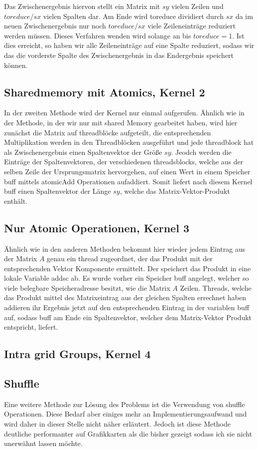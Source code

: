 \documentclass[10pt,a4paper]{article}
\begin{document}
	 Das Zwischenergebnis hiervon stellt ein Matrix mit $sy$ vielen Zeilen und $toreduce/sx$ vielen Spalten dar.
	 Am Ende wird toreduce dividiert durch $sx$ da im neuen Zwischenergebnis nur noch $toreduce/sx$ viele Zeileneinträge reduziert werden müssen. Dieses Verfahren wenden wird solange an bis $toreduce=1$. Ist dies erreicht, so haben wir alle Zeileneinträge auf eine Spalte reduziert, sodass wir das die vorderste Spalte des Zwischenergebnis in das Endergebnis speichert können.
	 \subsection{Sharedmemory mit Atomics, Kernel 2}
	 In der zweiten Methode wird der Kernel nur einmal aufgerufen. Ähnlich wie in der Methode, in der wir nur mit shared Memory gearbeitet haben, wird hier zunächst die Matrix auf threadblöcke aufgeteilt, die entsprechenden Multiplikation werden in den Threadblöcken ausgeführt und jede threadblock hat als Zwischenergebnis einen Spaltenvektor der Größe $sy$. Jeodch werden die Einträge der Spaltenvektoren, der verschiedenen threadsblocks, welche aus der selben Zeile der Ursprungsmatrix hervorgehen, auf einen Wert in einem Speicher buff mittels atomicAdd Operationen aufaddiert. Somit liefert nach diesem Kernel buff einen Spaltenvektor der Länge $sy$, welche das Matrix-Vektor-Produkt enthält.
	 \subsection{Nur Atomic Operationen, Kernel 3}
	 Ähnlich wie in den anderen Methoden bekommt hier wieder jedem Eintrag aus der Matrix $A$ genau ein thread zugeordnet, der das Produkt mit der entsprechenden Vektor Komponente ermittelt. Der speichert das Produkt in eine lokale Variable addsc ab. Es wurde vorher ein Speicher buff angelegt, welcher so viele belegbare Speicheradresse besitzt, wie die Matrix $A$ Zeilen. Threads, welche das Produkt mittel des Matrixeintrag aus der gleichen Spalten errechnet haben addieren ihr Ergebnis jetzt auf den entsprechenden Eintrag in der variablen buff auf, sodass buff am Ende ein Spaltenvektor, welcher dem Matrix-Vektor Produkt entspricht, liefert.
	 \subsection{Intra grid Groups, Kernel 4}  
	 
	 \subsection{Shuffle}
	 Eine weitere Methode zur Lösung des Problems ist die Verwendung von shuffle Operationen. Diese Bedarf aber einiges mehr an Implementierungsaufwand und wird daher in dieser Stelle nicht näher erläutert. Jedoch ist diese Methode deutliche performanter auf Grafikkarten als die bisher gezeigt sodass ich sie nicht unerwähnt lassen möchte.
\end{document}
